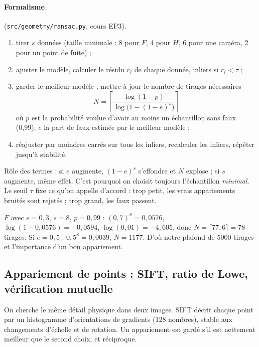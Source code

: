 \documentclass[11pt,a4paper]{article}
\begin{document}
\paragraph{Formalisme} (\texttt{src/geometry/ransac.py}, cours EP3).
\begin{enumerate}
  \item tirer $s$ données (taille minimale : 8 pour $F$, 4 pour $H$, 6 pour une caméra, 2 pour un
        point de fuite) ;
  \item ajuster le modèle, calculer le résidu $r_i$ de chaque donnée, inliers si $r_i<\tau$ ;
  \item garder le meilleur modèle ; mettre à jour le nombre de tirages nécessaires
  \[ N=\left\lceil\frac{\log(1-p)}{\log\bigl(1-(1-e)^s\bigr)}\right\rceil \]
        où $p$ est la probabilité voulue d'avoir au moins un échantillon sans faux (0,99), $e$ la
        part de faux estimée par le meilleur modèle ;
  \item réajuster par moindres carrés sur tous les inliers, recalculer les inliers, répéter jusqu'à
        stabilité.
\end{enumerate}
Rôle des termes : si $e$ augmente, $(1-e)^s$ s'effondre et $N$ explose ; si $s$ augmente, même effet.
C'est pourquoi on choisit toujours l'échantillon \emph{minimal}. Le seuil $\tau$ fixe ce qu'on appelle
\og d'accord \fg{} : trop petit, les vrais appariements bruités sont rejetés ; trop grand, les faux
passent.

\begin{exemple}
$F$ avec $e=0{,}3$, $s=8$, $p=0{,}99$ : $(0{,}7)^8=0{,}0576$, $\log(1-0{,}0576)=-0{,}0594$,
$\log(0{,}01)=-4{,}605$, donc $N=\lceil 77{,}6\rceil = 78$ tirages. Si $e=0{,}5$ :
$0{,}5^8=0{,}0039$, $N=1177$. D'où notre plafond de 5000 tirages et l'importance d'un bon appariement.
\end{exemple}

\subsection{Appariement de points : SIFT, ratio de Lowe, vérification mutuelle}

\begin{intuition}
On cherche le même détail physique dans deux images. SIFT décrit chaque point par un histogramme
d'orientations de gradients (128 nombres), stable aux changements d'échelle et de rotation. Un
appariement est gardé s'il est nettement meilleur que le second choix, et réciproque.
\end{intuition}
\end{document}
